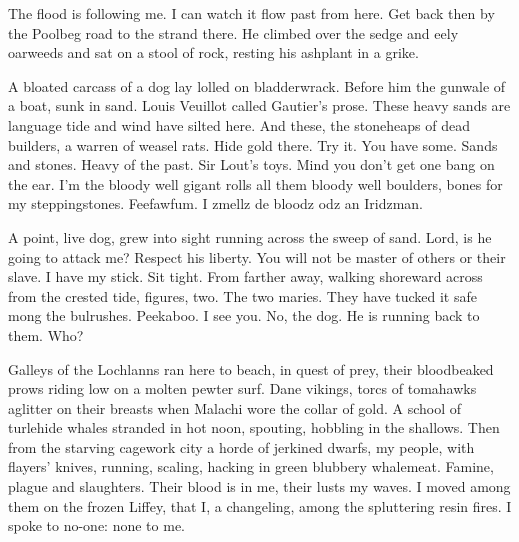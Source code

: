 The flood is following me.
I can watch it flow past from here.
Get back then by the Poolbeg road to the strand there.
He climbed over the sedge and eely oarweeds
and sat on a stool of rock, resting his ashplant in a grike.

A bloated carcass of a dog lay lolled on bladderwrack.
Before him the gunwale of a boat, sunk in sand.
 Louis Veuillot called Gautier's prose.
These heavy sands are language tide and wind have silted here.
And these, the stoneheaps of dead builders, a warren of weasel rats.
Hide gold there.
Try it.
You have some.
Sands and stones.
Heavy of the past.
Sir Lout's toys.
Mind you don't get one bang on the ear.
I'm the bloody well gigant
rolls all them bloody well boulders,
bones for my steppingstones.
Feefawfum.
I zmellz de bloodz odz an Iridzman.

A point, live dog,
grew into sight running across the sweep of sand.
Lord, is he going to attack me?
Respect his liberty.
You will not be master of others or their slave.
I have my stick.
Sit tight.
From farther away,
walking shoreward across from the crested tide,
figures, two.
The two maries.
They have tucked it safe mong the bulrushes.
Peekaboo.
I see you.
No, the dog.
He is running back to them.
Who?

Galleys of the Lochlanns ran here to beach,
in quest of prey,
their bloodbeaked prows riding low on a molten pewter surf.
Dane vikings,
torcs of tomahawks aglitter on their breasts
when Malachi wore the collar of gold.
A school of turlehide whales stranded in hot noon, spouting,
hobbling in the shallows.
Then from the starving cagework city
a horde of jerkined dwarfs,
my people, with flayers' knives,
running, scaling, hacking in green blubbery whalemeat.
Famine, plague and slaughters.
Their blood is in me, their lusts my waves.
I moved among them on the frozen Liffey,
that I, a changeling, among the spluttering resin fires.
I spoke to no-one:
none to me.

